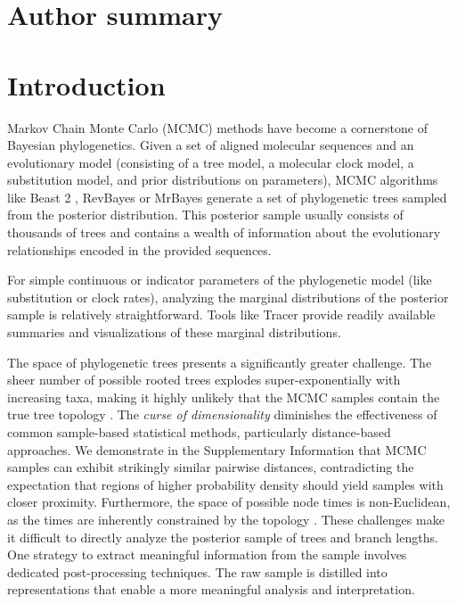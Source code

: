 \documentclass[10pt,letterpaper]{article}
\begin{document}
\section*{Author summary}


\linenumbers

\section*{Introduction}

Markov Chain Monte Carlo (MCMC) methods have become a cornerstone of Bayesian phylogenetics. Given a set of aligned molecular sequences and an evolutionary model (consisting of a tree model, a molecular clock model, a substitution model, and prior distributions on parameters), MCMC algorithms like Beast 2 \cite{beast2}, RevBayes \cite{revbayes} or MrBayes \cite{mrbayes} generate a set of phylogenetic trees sampled from the posterior distribution. This posterior sample usually consists of thousands of trees and contains a wealth of information about the evolutionary relationships encoded in the provided sequences.

For simple continuous or indicator parameters of the phylogenetic model (like substitution or clock rates), analyzing the marginal distributions of the posterior sample is relatively straightforward. Tools like Tracer \cite{tracer} provide readily available summaries and visualizations of these marginal distributions.

The space of phylogenetic trees presents a significantly greater challenge. The sheer number of possible rooted trees explodes super-exponentially with increasing taxa, making it highly unlikely that the MCMC samples contain the true tree topology \cite{ccd}. The \emph{curse of dimensionality} \cite{curse,curse2} diminishes the effectiveness of common sample-based statistical methods, particularly distance-based approaches. We demonstrate in the Supplementary Information that MCMC samples can exhibit strikingly similar pairwise distances, contradicting the expectation that regions of higher probability density should yield samples with closer proximity. Furthermore, the space of possible node times is non-Euclidean, as the times are inherently constrained by the topology \cite{steelsemple,wald,tauspace,tropical,bhv}. These challenges make it difficult to directly analyze the posterior sample of trees and branch lengths. One strategy to extract meaningful information from the sample involves dedicated post-processing techniques. The raw sample is distilled into representations that enable a more meaningful analysis and interpretation.
\end{document}

